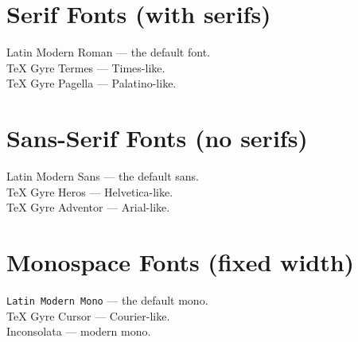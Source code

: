 \documentclass[12pt, a4paper]{article}
\begin{document}
\section*{Serif Fonts (with serifs)}
{\textrm{Latin Modern Roman}} --- the default font. \\
{\timesfont TeX Gyre Termes} --- Times-like. \\
{\palatinofont TeX Gyre Pagella} --- Palatino-like.

\section*{Sans-Serif Fonts (no serifs)}
{\textsf{Latin Modern Sans}} --- the default sans. \\
{\helveticafont TeX Gyre Heros} --- Helvetica-like. \\
{\arialfont TeX Gyre Adventor} --- Arial-like.

\section*{Monospace Fonts (fixed width)}
{\texttt{Latin Modern Mono}} --- the default mono. \\
{\courierfont TeX Gyre Cursor} --- Courier-like. \\
{\inconsolatafont Inconsolata} --- modern mono.
\end{document}
